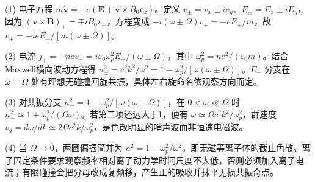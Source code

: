 (1) 电子方程 \(m\dot{\mathbf v}=-e(\mathbf E+\mathbf v\times B_0\mathbf e_z)\)。定义 \(v_\pm=v_x\pm iv_y\)、\(E_\pm=E_x\pm iE_y\)，因为 \((\mathbf v\times\mathbf B)_\pm=\mp iB_0v_\pm\)，方程变成 \(-i(\omega\pm\Omega)v_\pm=-eE_\pm/m\)，故 \(v_\pm=-ieE_\pm/[m(\omega\pm\Omega)]\)。

(2) 电流 \(j_\pm=-nev_\pm=i\varepsilon_0\omega_p^2E_\pm/(\omega\pm\Omega)\)，其中 \(\omega_p^2=ne^2/(\varepsilon_0m)\)。结合Maxwell横向波动方程得 \(\boxed{n_\pm^2=c^2k^2/\omega^2=1-\omega_p^2/[\omega(\omega\pm\Omega)]}\)。\(E_-\) 分支在 \(\omega=\Omega\) 处有理想无碰撞回旋共振，具体左右旋命名依观察方向而定。

(3) 对共振分支 \(n_-^2=1-\omega_p^2/[\omega(\omega-\Omega)]\)，在 \(0<\omega\ll\Omega\) 时 \(n_-^2\simeq1+\omega_p^2/(\Omega\omega)\)。若第二项还远大于1，便有 \(\boxed{\omega\simeq\Omega c^2k^2/\omega_p^2}\)，群速度 \(v_g=d\omega/dk\simeq2\Omega c^2k/\omega_p^2\)，是色散明显的哨声波而非恒速电磁波。

(4) 当 \(\Omega\to0\)，两圆偏振简并为 \(n^2=1-\omega_p^2/\omega^2\)，即无磁等离子体的截止色散。离子固定条件要求观察频率相对离子动力学时间尺度不太低，否则必须加入离子电流；有限碰撞会把分母改成复频移，产生正的吸收并抹平无损共振奇点。
